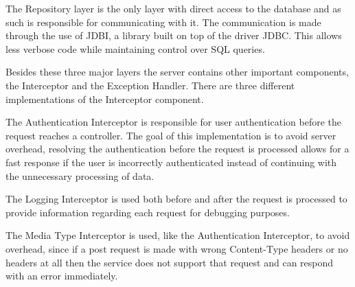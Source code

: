 The Repository layer is the only layer with direct access to the database and as such is responsible for communicating
with it. The communication is made through the use of JDBI\cite{jdbidocs}, a library built on top of the driver JDBC\cite{jdbcdocs}. This allows
less verbose code while maintaining control over SQL queries. 

Besides these three major layers the server contains other important components, the Interceptor\cite{springinterceptor} and the Exception Handler\cite{springexception}.
There are three different implementations of the Interceptor component.

The Authentication Interceptor is responsible for user authentication before the request reaches a controller. The goal of this
implementation is to avoid server overhead, resolving the authentication before the request is processed allows for a fast response
if the user is incorrectly authenticated instead of continuing with the unnecessary processing of data.

The Logging Interceptor is used both before and after the request is processed to provide information 
regarding each request for debugging purposes.

The Media Type Interceptor is used, like the Authentication Interceptor, to avoid overhead, since if a post request is made
with wrong Content-Type headers or no headers at all then the service does not support that request and can respond with an 
error immediately.

